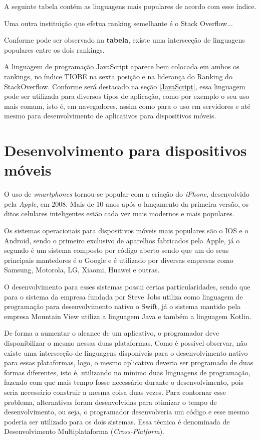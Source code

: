 A seguinte tabela contém as linguagens mais populares de acordo com esse índice.

Uma outra instituição que efetua ranking semelhante é o Stack Overflow...

Conforme pode ser observado na \textbf{tabela}, existe uma intersecção de linguagens populares entre os dois rankings.

A linguagem de programação JavaScript aparece bem colocada em ambos os rankings, no índice TIOBE na sexta posição e na liderança do Ranking do StackOverflow. Conforme será destacado na seção \ref{JavaScript}, essa linguagem pode ser utilizada para diversos tipos de aplicação, como por exemplo o seu uso mais comum, isto é, em navegadores, assim como para o uso em servidores e até mesmo para desenvolvimento de aplicativos para dispositivos móveis.

\section{Desenvolvimento para dispositivos móveis}

O uso de \textit{smartphones} tornou-se popular com a criação do \textit{iPhone}, desenvolvido pela \textit{Apple}, em 2008. Mais de 10 anos após o lançamento da primeira versão, os ditos celulares inteligentes estão cada vez mais modernos e mais populares.


Os sistemas operacionais para dispositivos móveis mais populares são o IOS e o Android, sendo o primeiro exclusivo de aparelhos fabricados pela Apple, já o segundo é um sistema composto por código aberto sendo que um do seus principais mantedores é o Google e é utilizado por diversas empresas como Samsung, Motorola, LG, Xiaomi, Huawei e outras.

O desenvolvimento para esses sistemas possui certas particularidades, sendo que para o sistema da empresa fundada por Steve Jobs utiliza como linguagem de programação para desenvolvimento nativo o Swift, já o sistema mantido pela empresa Mountain View utiliza a linguagem Java e também a linguagem Kotlin.

De forma a aumentar o alcance de um aplicativo, o programador deve disponibilizar o mesmo nessas duas plataformas. Como é possível observar, não existe uma intersecção de linguagens disponíveis para o desenvolvimento nativo para essas plataformas, logo, o mesmo aplicativo deveria ser programado de duas formas diferentes, isto é, utilizando no mínimo duas linguagens de programação, fazendo com que mais tempo fosse necessário durante o desenvolvimento, pois seria necessário construir a mesma coisa duas vezes. Para contornar esse problema, alternativas foram desenvolvidas para otimizar o tempo de desenvolvimento, ou seja, o programador desenvolveria um código e esse mesmo poderia ser utilizado para os dois sistemas. Essa técnica é denominada de Desenvolvimento Multiplataforma (\textit{Cross-Platform}).

